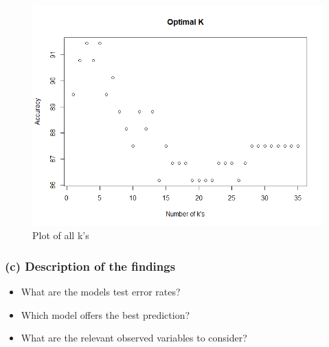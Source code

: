 \begin{figure}[H]
\centering
\includegraphics[scale=0.65]{Graphics/Assignment1/Rplot.png}
\caption{Plot of all k's}
\label{fig:optimal_ks}
\end{figure}


\subsubsection*{(c) Description of the findings}

\begin{itemize}
    \item What are the models test error rates?
    \item Which model offers the best prediction?
    \item What are the relevant observed variables to consider?
\end{itemize}




